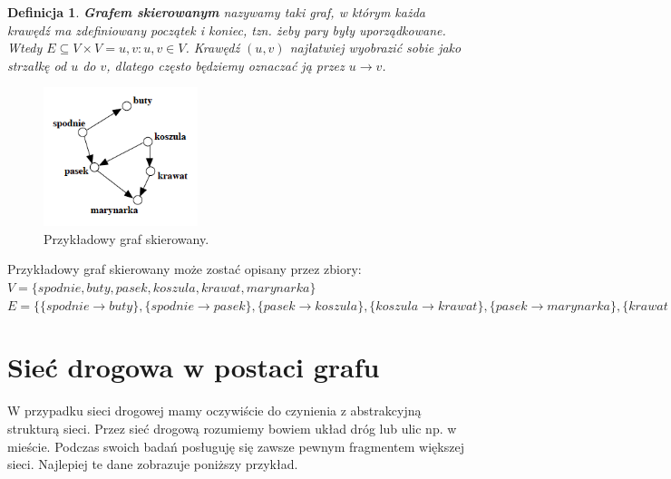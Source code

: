 \documentclass[twoside,12pt]{report}
\newtheorem{definition}{Definicja} %
\begin{document}
\vspace*{30px}
\begin{definition}\label{Graf skierowany}
\textbf{Grafem skierowanym} nazywamy taki graf, w którym każda krawędź ma zdefiniowany początek i koniec, tzn. żeby pary były uporządkowane. Wtedy $E \subseteq V \times V = {{u,v}:u,v \in V}$.
Krawędź $(u,v)$ najłatwiej wyobrazić sobie jako strzałkę od $u$ do $v$, dlatego często będziemy oznaczać ją przez $u \rightarrow v$.
\end{definition}

\begin{figure}[ht]
\begin{center}
\includegraphics[width=0.40\textwidth]{img/graf2}
\caption{Przykładowy graf skierowany\cite{grafy}.} 
\end{center}
\end{figure}

Przykładowy graf skierowany może zostać opisany przez zbiory:
\newline
\begin{math}
V=\{spodnie, buty, pasek, koszula, krawat, marynarka\}
\end{math}
\newline
\begin{math}
E=\{\{spodnie \rightarrow buty\},\{spodnie  \rightarrow pasek\},
	\{pasek \rightarrow koszula\},\{koszula \rightarrow krawat\},
	\{pasek \rightarrow marynarka\},\{krawat \rightarrow marynarka\}\}
\end{math}

\section{Sieć drogowa w postaci grafu}
W przypadku sieci drogowej mamy oczywiście do czynienia z abstrakcyjną strukturą sieci. Przez sieć drogową rozumiemy bowiem układ dróg lub ulic np. w mieście. Podczas swoich badań posługuję się zawsze pewnym fragmentem większej sieci. Najlepiej te dane zobrazuje poniższy przykład.
\end{document}

